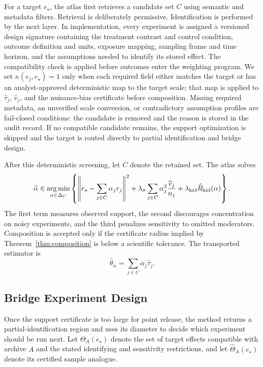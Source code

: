 \documentclass[11pt]{article}
\numberwithin{equation}{section}
\DeclareMathOperator*{\argmin}{arg\,min}
\newcommand{\1}{\mathbf 1}
\newcommand{\norm}[1]{\left\lVert #1\right\rVert}
\begin{document}
For a target \(e_\star\), the atlas first retrieves a candidate set \(C\) using semantic and metadata filters.  Retrieval is deliberately permissive.  Identification is performed by the next layer.  In implementation, every experiment is assigned a versioned design signature containing the treatment contrast and control condition, outcome definition and units, exposure mapping, sampling frame and time horizon, and the assumptions needed to identify its stored effect.  The compatibility check is applied before outcomes enter the weighting program.  We set \(\kappa(e_j,e_\star)=1\) only when each required field either matches the target or has an analyst-approved deterministic map to the target scale; that map is applied to \(\widehat\tau_j\), \(\widehat v_j\), and the nuisance-bias certificate before composition.  Missing required metadata, an unverified scale conversion, or contradictory assumption profiles are fail-closed conditions: the candidate is removed and the reason is stored in the audit record.  If no compatible candidate remains, the support optimization is skipped and the target is routed directly to partial identification and bridge design.

After this deterministic screening, let \(C\) denote the retained set.  The atlas solves
\begin{equation}
\label{eq:support-program}
  \widehat\alpha
  \in
  \argmin_{\alpha\in\Delta_C}
  \left\{
    \norm{r_\star-\sum_{j\in C}\alpha_jr_j}^2
    +\lambda_\sigma\sum_{j\in C}\alpha_j^2\frac{\widehat v_j}{n_j}
    +\lambda_{\rm hid}\widehat R_{\rm hid}(\alpha)
  \right\}.
\end{equation}
The first term measures observed support, the second discourages concentration on noisy experiments, and the third penalizes sensitivity to omitted moderators.  Composition is accepted only if the certificate radius implied by Theorem~\ref{thm:composition} is below a scientific tolerance.  The transported estimator is
\begin{equation}
\label{eq:atlas-estimator}
  \widehat\theta_\alpha
  =
  \sum_{j\in C}\alpha_j\widehat\tau_j.
\end{equation}

\subsection{Bridge Experiment Design}

Once the support certificate is too large for point release, the method returns a partial-identification region and uses its diameter to decide which experiment should be run next.  Let \(\Theta_A(e_\star)\) denote the set of target effects compatible with archive \(A\) and the stated identifying and sensitivity restrictions, and let \(\widehat\Theta_A(e_\star)\) denote its certified sample analogue.
\end{document}
